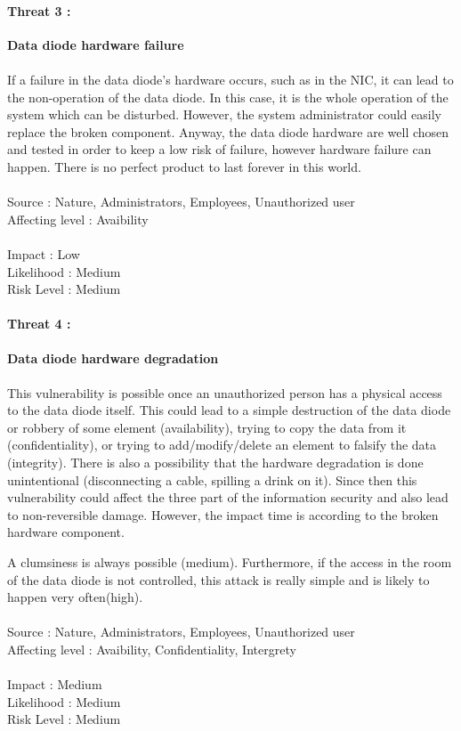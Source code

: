 \documentclass[a4paper,10pt]{article}
\begin{document}
\paragraph{Threat 3 :}  \textbf{Data diode hardware failure} 
\paragraph{}If a failure in the data diode's hardware occurs, such as in the NIC, it can lead to the non-operation of the data diode. In this case, it is the whole operation of the system which can be disturbed. However, the system administrator could easily replace the broken component.
Anyway, the data diode hardware are well chosen and tested in order to keep a low risk of failure, however hardware failure can happen. There is no perfect product to last forever in this world.\\ \\
Source : Nature, Administrators, Employees, Unauthorized user \\ 
Affecting level : Avaibility \\ \\
Impact : Low \\
Likelihood : Medium \\
Risk Level : Medium

\paragraph{Threat 4 :}  \textbf{Data diode hardware degradation} 
\paragraph{}This vulnerability is possible once an unauthorized person has a physical access to the data diode itself. This could lead to a simple destruction of the data diode or robbery of some element (availability), trying to copy the data from it (confidentiality), or trying to add/modify/delete an element to falsify the data (integrity). There is also a possibility that the hardware degradation is done unintentional (disconnecting a cable, spilling a drink on it).
Since then this vulnerability could affect the three part of the information security and also lead to non-reversible damage. However, the impact time is according to the broken hardware component. 

A clumsiness is always possible (medium). Furthermore, if the access in the room of the data diode is not controlled, this attack is really simple and is likely to happen very often(high). \\ \\
Source : Nature, Administrators, Employees, Unauthorized user  \\ 
Affecting level : Avaibility, Confidentiality, Intergrety \\ \\
Impact : Medium \\
Likelihood : Medium \\
Risk Level : Medium
\end{document}
